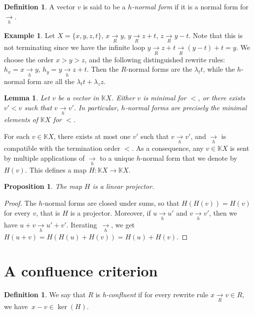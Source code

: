 \documentclass[10pt]{easychair}
\newtheorem{lemma}[theorem]{Lemma}
\newtheorem{proposition}[theorem]{Proposition}
\theoremstyle{definition}
\newtheorem{definition}[theorem]{Definition}
\newtheorem{example}[theorem]{Example}
\newcommand\K{\mathbb{K}}
\newcommand\KX{\K X}
\newcommand\rewR{\underset{R}{\longrightarrow}}
\newcommand\rewh{\underset{h}{\longrightarrow}}
\begin{document}
\medskip

\begin{definition}
  A vector $v$ is said to be a \emph{$h$-normal form} if it is a normal
  form for $\rewh$.
\end{definition}


\begin{example}\label{ex:h_norma_form}
Let $X=\{x,y,z,t\}$, $x\rewR y$, $y \rewR z + t$, $z \rewR y - t$. Note that this is not terminating since we have the infinite loop $y \rewR z + t \rewR (y - t) + t = y$. We choose the order $x > y > z$, and the following distinguished rewrite rules: $h_x = x \rewh y$, $h_y = y \rewh z + t$. Then the $R$-normal forms are the $\lambda_t t$, while the $h$-normal form are all the $\lambda_t t + \lambda_z z$.
\end{example}


\begin{lemma}\label{lem:h_normal_forms}
  Let $v$ be a vector in $\KX$. Either $v$ is minimal for $<$, or there exists $v'<v$ such that $v\rewh v'$. In particular, $h$-normal forms are
  precisely the minimal elements of $\KX$ for $<$. 
\end{lemma}

\medskip

For each $v\in\KX$, there exists at most one $v'$ such that $v \rewh v'$,
and $\rewh$ is compatible with the termination order $<$. As a
consequence, any $v \in \KX$ is sent by multiple applications of $\rewh$
to a unique $h$-normal form that we denote by $H(v)$. This defines a map
$H : \KX \to \KX$.  

\begin{proposition}\label{prop:linearity_of_H}
  The map $H$ is a linear projector.
\end{proposition}

\begin{proof}
  The $h$-normal forms are closed under sums, so that $H(H(v))=H(v)$ for
  every $v$, that is $H$ is a projector. Moreover, if $u \rewh u'$ and
  $v \rewh v'$, then we have $u + v \rewh u' + v'$. Iterating~$\rewh$, we
  get $H(u + v) = H (H(u)+H(v))=H(u)+H(v)$. 
\end{proof}

\section{A confluence criterion}

\begin{definition}\label{def:standardisation_property}
  We say that $R$ is \emph{h-confluent} if for every rewrite rule $x\rewR v\in R$, we have $\ x-v\in\ker(H)$.
\end{definition}
\end{document}
